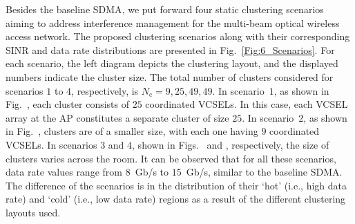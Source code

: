 \documentclass[lettersize,journal]{IEEEtran}
\begin{document}
Besides the baseline \ac{SDMA}, we put forward four static clustering scenarios aiming to address interference management for the multi-beam optical wireless access network. The proposed clustering scenarios along with their corresponding \ac{SINR} and data rate distributions are presented in Fig.~\ref{Fig:6_Scenarios}. For each scenario, the left diagram depicts the clustering layout, and the displayed numbers indicate the cluster size. The total number of clusters considered for scenarios $1$ to $4$, respectively, is $N_\mathrm{c}=9,25,49,49$. In scenario~$1$, as shown in Fig.~, each cluster consists of $25$ coordinated \acp{VCSEL}. In this case, each \ac{VCSEL} array at the \ac{AP} constitutes a separate cluster of size $25$. In scenario~$2$, as shown in Fig.~, clusters are of a smaller size, with each one having $9$ coordinated \acp{VCSEL}. In scenarios $3$ and $4$, shown in Figs.~ and , respectively, the size of clusters varies across the room. It can be observed that for all these scenarios, data rate values range from $8$~Gb/s to $15$~Gb/s, similar to the baseline \ac{SDMA}. The difference of the scenarios is in the distribution of their `hot' (i.e., high data rate) and `cold' (i.e., low data rate) regions as a result of the different clustering layouts used.
\end{document}
